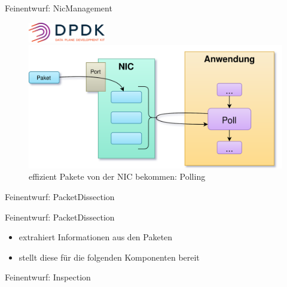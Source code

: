 \documentclass{beamer}
\begin{document}
\begin{frame}{Feinentwurf: NicManagement}
    \begin{figure}
        \includegraphics[width=0.3\textwidth]{dpdk_logo.png}
        \includegraphics[width=\linewidth]{polling.png}
        \center
        effizient Pakete von der NIC bekommen: Polling
    \end{figure}
\end{frame}

\begin{frame}{Feinentwurf: PacketDissection}
\end{frame}

\begin{frame}{Feinentwurf: PacketDissection}
    \begin{itemize}
        \item extrahiert Informationen aus den Paketen
        \item stellt diese für die folgenden Komponenten bereit
    \end{itemize}
\end{frame}

\begin{frame}{Feinentwurf: Inspection}
\end{frame}
\end{document}
